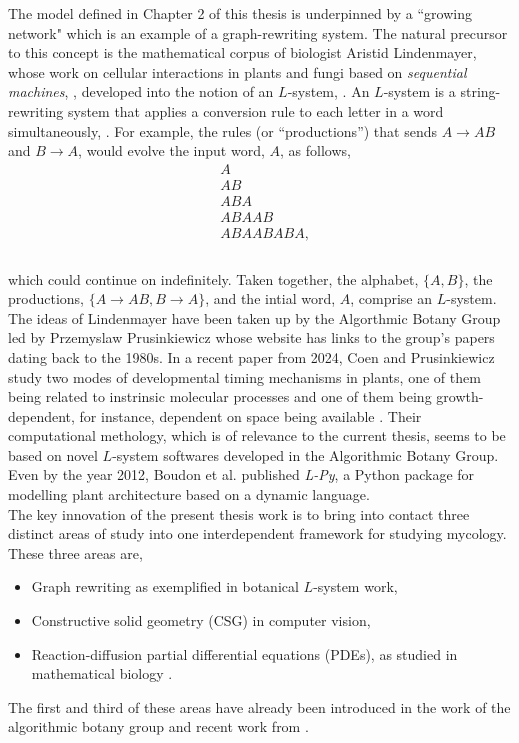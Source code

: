 The model defined in Chapter 2 of this thesis is underpinned by a ``growing network" which is an example 
of a graph-rewriting system. The natural precursor 
to this concept is the mathematical corpus of biologist Aristid Lindenmayer, whose work 
on cellular interactions in plants and fungi based on \textit{sequential machines}, 
\cite{lindenmayer1968mathematical}, developed 
into the notion of an $L$-system, \cite{prusinkiewicz2012algorithmic}. An $L$-system
is a string-rewriting system that applies a conversion rule to each letter in a word 
simultaneously, \cite{prusinkiewicz2012algorithmic}. For example,
the rules (or ``productions'') that sends $A \rightarrow AB$ and $B \rightarrow A$,
would evolve the input word, $A$, as follows,
\begin{equation*}
\begin{split}
&A \\
&AB \\
&ABA \\
&ABAAB \\
&ABAABABA, \\
\end{split}
\end{equation*}
\\
which could continue on indefinitely. Taken together,
the alphabet, $\{A, B\}$, the productions, $\{ A \rightarrow AB, B \rightarrow A \}$, and 
the intial word, $A$, comprise an $L$-system. 
\\

The ideas  
of Lindenmayer have been taken up by the Algorthmic Botany Group \cite{algorithmicbotany_papers}
led by Przemyslaw Prusinkiewicz whose website has links to the group's papers dating
back to the 1980s. In a recent paper from 2024, Coen and Prusinkiewicz study 
two modes of developmental timing mechanisms in plants, one of them being related 
to instrinsic molecular processes and one of them being growth-dependent, for instance, dependent 
on space being available \cite{coen2024developmental}. Their computational methology,
which is of relevance to the current thesis, seems to be based on novel $L$-system
softwares developed in the Algorithmic Botany Group. Even by the year 2012, 
Boudon et al. \cite{boudon2012py} published \textit{L-Py}, a Python package 
for modelling plant architecture based on a dynamic language.  
\\

The key innovation of the present thesis work is to 
bring into contact three distinct areas of 
study into one interdependent framework for studying mycology. These three 
areas are,
\begin{itemize}
    \item Graph rewriting as exemplified in botanical $L$-system work,
    \item Constructive solid geometry (CSG) in computer vision,
    \item Reaction-diffusion partial differential equations (PDEs),
          as studied in mathematical biology \cite{turing1990chemical}.
\end{itemize}
The first and third of these areas have already been introduced in the work of 
the algorithmic botany group and recent work from \cite{tronnolone2018diffusion}.

